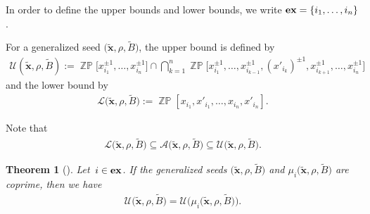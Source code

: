 \documentclass[10pt,a4paper]{amsart}
\numberwithin{equation}{section}
\newtheorem{Theorem}{Theorem}[section]
\begin{document}
In order to define the upper bounds and lower bounds, we write ${\rm\mathbf{ex}}=\{i_1,\ldots,i_n\}$.
\begin{Definition}
For a generalized seed $\big(\widetilde{\mathbf{x}},\rho,\widetilde{B}\big)$, the upper bound is defined by
\begin{gather*}
\mathcal{U}(\widetilde{\mathbf{x}}, \rho, \widetilde{B}):= \mathop{\mathbb{ZP}}\!\big[x_{i_1}^{\pm1},\ldots,x_{i_n}^{\pm1}\big]\cap
\bigcap\limits_{k=1}^{n}\mathop{\mathbb{ZP}}\!\big[x_{i_1}^{\pm1},\ldots,x_{i_{k-1}}^{\pm1},(x'_{i_k})^{\pm1},x_{i_{k+1}}^{\pm1}, \ldots,x_{i_n}^{\pm1}\big]
\end{gather*}
and the lower bound by
\begin{gather*}
\mathcal{L}\big(\widetilde{\mathbf{x}},\rho,\widetilde{B}\big):= \mathop{\mathbb{ZP}}[x_{i_1},x'_{i_1},\ldots,x_{i_n},x'_{i_n}].
\end{gather*}
\end{Definition}

Note that
\begin{gather*}
 \mathcal{L}\big(\widetilde{\mathbf{x}},\rho,\widetilde{B}\big)\subseteq \mathcal{A}\big(\widetilde{\mathbf{x}},\rho,\widetilde{B}\big) \subseteq \mathcal{U}\big(\widetilde{\mathbf{x}},\rho,\widetilde{B}\big).
\end{gather*}

\begin{Theorem}[{\cite[Theorem 4.1]{gsv18}}]
Let~$i\in{\rm\mathbf{ex}}$. If the generalized seeds $\big(\widetilde{\mathbf{x}},\rho,\widetilde{B}\big)$ and $\mu_i\big(\widetilde{\mathbf{x}},\rho,\widetilde{B}\big)$ are coprime, then we have
\begin{gather*}
\mathcal{U}\big(\widetilde{\mathbf{x}},\rho,\widetilde{B}\big) =\mathcal{U}\big(\mu_i\big(\widetilde{\mathbf{x}},\rho,\widetilde{B}\big)\big).
\end{gather*}
\end{Theorem}
\end{document}
